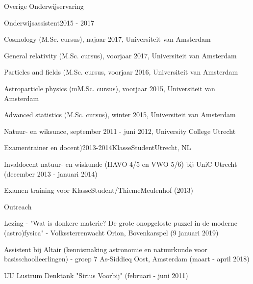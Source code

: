 \begin{rSection}{Overige Onderwijservaring}

\begin{rSubsection}{Onderwijsassistent}{2015 - 2017}{}{}
 \vspace{-1.5em}
	\item Cosmology (M.Sc. cursus), najaar 2017, Universiteit van Amsterdam
	\item General relativity (M.Sc. cursus), voorjaar 2017, Universiteit van Amsterdam
	\item Particles and fields (M.Sc. cursus, voorjaar 2016, Universiteit van Amsterdam
	\item Astroparticle physics (mM.Sc. cursus), voorjaar 2015, Universiteit van Amsterdam
	\item Advanced statistics (M.Sc. cursus), winter 2015, Universiteit van Amsterdam
  \item Natuur- en wiksunce, september 2011 - juni 2012, University College Utrecht 
\end{rSubsection}

\begin{rSubsection}{Examentrainer en docent)}{2013-2014}{KlasseStudent}{Utrecht, NL}
  \vspace{-1.5em}
  \item Invaldocent natuur- en wiskunde (HAVO 4/5 en VWO 5/6) bij UniC Utrecht (december 2013 - januari 2014)
  \item Examen training voor KlasseStudent/ThiemeMeulenhof (2013)
\end{rSubsection}

\begin{rSubsection}{Outreach}{}{}{}
  \vspace{-1.5em}
      \item Lezing - "Wat is donkere materie? De grote onopgeloste puzzel in de moderne (astro)fysica" - Volkssterrenwacht Orion,  Bovenkarspel (9 januari 2019)
      \item Assistent bij Altair (kennismaking astronomie en natuurkunde voor basisschoolleerlingen) - groep 7 As-Siddieq Oost, Amsterdam (maart - april 2018)
      \item UU Lustrum Denktank "Sirius Voorbij" (februari - juni 2011)
\end{rSubsection}
\end{rSection}


